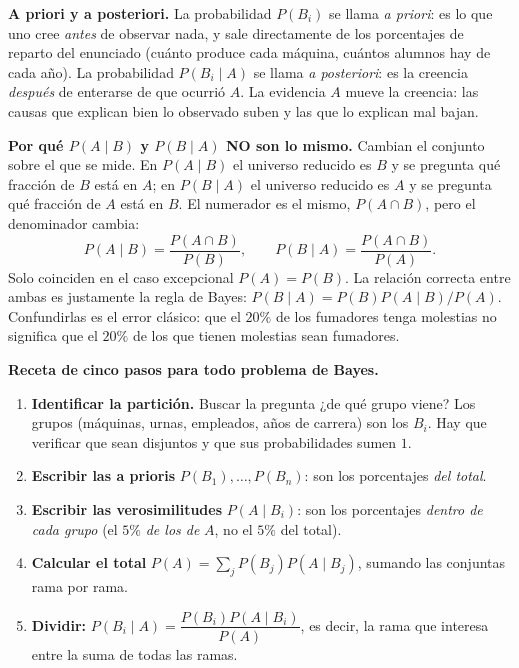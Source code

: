 \documentclass[11pt]{article}
\begin{document}
\begin{teo}
\medskip
\textbf{A priori y a posteriori.} La probabilidad $P(B_i)$ se llama \emph{a priori}: es lo que uno cree \emph{antes} de observar nada, y sale directamente de los porcentajes de reparto del enunciado (cuánto produce cada máquina, cuántos alumnos hay de cada año). La probabilidad $P(B_i\mid A)$ se llama \emph{a posteriori}: es la creencia \emph{después} de enterarse de que ocurrió $A$. La evidencia $A$ mueve la creencia: las causas que explican bien lo observado suben y las que lo explican mal bajan.

\medskip
\textbf{Por qué $P(A\mid B)$ y $P(B\mid A)$ NO son lo mismo.} Cambian el conjunto sobre el que se mide. En $P(A\mid B)$ el universo reducido es $B$ y se pregunta qué fracción de $B$ está en $A$; en $P(B\mid A)$ el universo reducido es $A$ y se pregunta qué fracción de $A$ está en $B$. El numerador es el mismo, $P(A\cap B)$, pero el denominador cambia:
\[
P(A\mid B)=\frac{P(A\cap B)}{P(B)},\qquad P(B\mid A)=\frac{P(A\cap B)}{P(A)} .
\]
Solo coinciden en el caso excepcional $P(A)=P(B)$. La relación correcta entre ambas es justamente la regla de Bayes: $P(B\mid A)=P(B)P(A\mid B)/P(A)$. Confundirlas es el error clásico: que el $20\%$ de los fumadores tenga molestias no significa que el $20\%$ de los que tienen molestias sean fumadores.
\end{teo}

\begin{tip}
\textbf{Receta de cinco pasos para todo problema de Bayes.}
\begin{enumerate}[leftmargin=*]
  \item \textbf{Identificar la partición.} Buscar la pregunta ¿de qué grupo viene? Los grupos (máquinas, urnas, empleados, años de carrera) son los $B_i$. Hay que verificar que sean disjuntos y que sus probabilidades sumen $1$.
  \item \textbf{Escribir las a prioris} $P(B_1),\dots,P(B_n)$: son los porcentajes \emph{del total}.
  \item \textbf{Escribir las verosimilitudes} $P(A\mid B_i)$: son los porcentajes \emph{dentro de cada grupo} (el $5\%$ \emph{de los de} $A$, no el $5\%$ del total).
  \item \textbf{Calcular el total} $P(A)=\sum_j P(B_j)P(A\mid B_j)$, sumando las conjuntas rama por rama.
  \item \textbf{Dividir:} $P(B_i\mid A)=\dfrac{P(B_i)P(A\mid B_i)}{P(A)}$, es decir, la rama que interesa entre la suma de todas las ramas.
\end{enumerate}
\end{tip}
\end{document}
